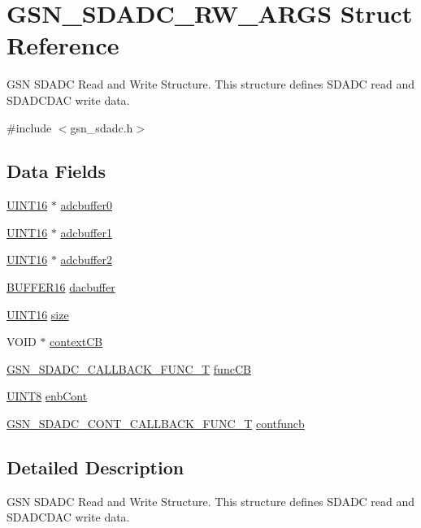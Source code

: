 \hypertarget{a00215}{
\section{GSN\_\-SDADC\_\-RW\_\-ARGS Struct Reference}
\label{a00215}
}


GSN SDADC Read and Write Structure. This structure defines SDADC read and SDADCDAC write data.  




{\ttfamily \#include $<$gsn\_\-sdadc.h$>$}

\subsection*{Data Fields}
\begin{DoxyCompactItemize}
\item 
\hyperlink{a00660_ga09f1a1fb2293e33483cc8d44aefb1eb1}{UINT16} $\ast$ \hyperlink{a00215_ace34805758a9affbaaae720eb90aa735}{adcbuffer0}
\item 
\hyperlink{a00660_ga09f1a1fb2293e33483cc8d44aefb1eb1}{UINT16} $\ast$ \hyperlink{a00215_a8a4f4b4f770cd2b7652dfa2310becfa3}{adcbuffer1}
\item 
\hyperlink{a00660_ga09f1a1fb2293e33483cc8d44aefb1eb1}{UINT16} $\ast$ \hyperlink{a00215_a4be6220f843912d59c9ceca3d9d35ea1}{adcbuffer2}
\item 
\hyperlink{a00002}{BUFFER16} \hyperlink{a00215_a2bc87ca9c44259b62873d1cf2061069e}{dacbuffer}
\item 
\hyperlink{a00660_ga09f1a1fb2293e33483cc8d44aefb1eb1}{UINT16} \hyperlink{a00215_a68890417cb73114517d0d8c594bd282e}{size}
\item 
VOID $\ast$ \hyperlink{a00215_a2898b010839acbc30fb49ec89189292c}{contextCB}
\item 
\hyperlink{a00652_ga1c7f85dc49dcc4b6c2fd8ee23dddfce6}{GSN\_\-SDADC\_\-CALLBACK\_\-FUNC\_\-T} \hyperlink{a00215_ade4c313eb150e6fea7b5cd4e904b9869}{funcCB}
\item 
\hyperlink{a00660_gab27e9918b538ce9d8ca692479b375b6a}{UINT8} \hyperlink{a00215_a359a1fb11fb5fc562d00321619df6340}{enbCont}
\item 
\hyperlink{a00652_gaaa7a87158dc8d5145295c2bc83eb4eb5}{GSN\_\-SDADC\_\-CONT\_\-CALLBACK\_\-FUNC\_\-T} \hyperlink{a00215_abffed4adaed28f91e95ec588b6885c63}{contfuncb}
\end{DoxyCompactItemize}


\subsection{Detailed Description}
GSN SDADC Read and Write Structure. This structure defines SDADC read and SDADCDAC write data. 

